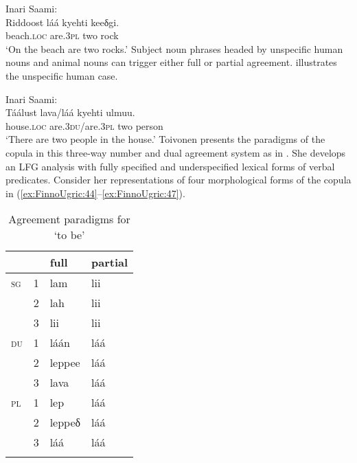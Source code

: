\documentclass[output=paper,hidelinks]{langscibook}
\begin{document}
\ea%
    \label{ex:FinnoUgric:42}Inari Saami:\\
    \gll Riddoost láá kyehti keeδgi.\\
       beach.\textsc{loc} are.\textsc{3pl} two rock\\
    \glt `On the beach are two rocks.'
    \z
Subject noun phrases headed by unspecific human nouns and animal nouns can trigger either full or partial agreement.  illustrates the unspecific human case.

\ea%
    \label{ex:FinnoUgric:43}Inari Saami:\\
    \gll Táálust lava/láá kyehti ulmuu.\\
        house.\textsc{loc} are.\textsc{3du/}are.\textsc{3pl} two person\\
    \glt `There are two people in the house.'
    \z
Toivonen presents the paradigms of the copula in this three-way number and dual agreement system as in . She develops an LFG analysis with fully specified and underspecified lexical forms of verbal predicates. Consider her representations of four morphological forms of the copula in (\ref{ex:FinnoUgric:44}--\ref{ex:FinnoUgric:47}).

\begin{table}
\begin{tabularx}{.5\textwidth}{XXll}
\lsptoprule
 &  & {\bfseries full} & {\bfseries partial}\\\midrule
\textsc{sg} & 1 & lam & lii\\
& 2 & lah & lii\\
& 3 & lii & lii\\
\textsc{du} & 1 & láán & láá\\
& 2 & leppee & láá\\
& 3 & lava & láá\\
\textsc{pl} & 1 & lep & láá\\
& 2 & leppeδ & láá\\
& 3 & láá & láá\\
\lspbottomrule
\end{tabularx}
\caption{Agreement paradigms for `to be'}
\label{tab:FinnoUgric:4}
\end{table}

\ea%
    \label{ex:FinnoUgric:44}
    \z
\end{document}
